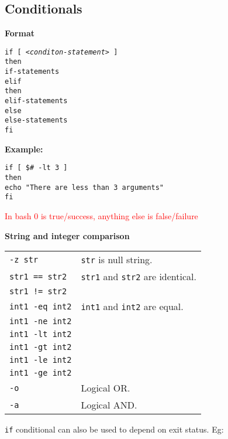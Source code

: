 \subsection{Conditionals}
\textbf{Format}
\begin{mdframed}
\texttt{if [ \textit{<conditon-statement>} ]}\\
\texttt{then}\\
\texttt{if-statements}\\
\texttt{elif}\\
\texttt{then}\\
\texttt{elif-statements}\\
\texttt{else}\\
\texttt{else-statements}\\
\texttt{fi}
\end{mdframed}

\columnbreak
\vfill \null

\textbf{Example:}\\
\begin{mdframed}
\texttt{if [ \$\# -lt 3 ]}\\
\texttt{then}\\
\texttt{echo "There are less than 3 arguments"}\\
\texttt{fi}
\end{mdframed}

\textcolor{red}{In bash 0 is true/success, anything else is false/failure}

\textbf{String and integer comparison}
\begin{tabularx}{\linewidth}{lX}
\texttt{-z str} & \texttt{str}  is null string.\\
\texttt{str1 == str2} & \texttt{str1} and \texttt{str2} are identical.\\
\texttt{str1 != str2} & \\
\texttt{int1 -eq int2} & \texttt{int1} and \texttt{int2} are equal.\\
\texttt{int1 -ne int2} & \\
\texttt{int1 -lt int2} & \\
\texttt{int1 -gt int2} & \\
\texttt{int1 -le int2} & \\
\texttt{int1 -ge int2} & \\
\texttt{-o} & Logical OR.\\
\texttt{-a} & Logical AND.\\
\end{tabularx}

\texttt{if} conditional can also be used to depend on exit status. Eg:\\

